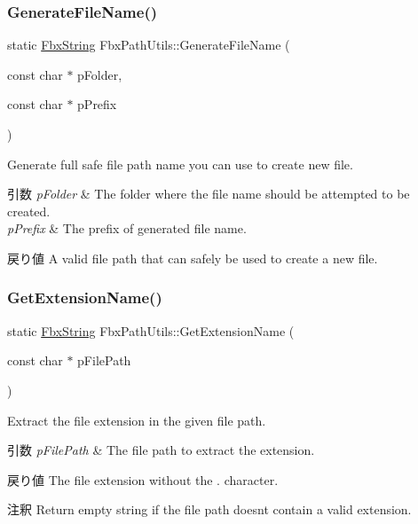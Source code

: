 \subsubsection{\texorpdfstring{Generate\+File\+Name()}{GenerateFileName()}}
{\footnotesize\ttfamily static \hyperlink{class_fbx_string}{Fbx\+String} Fbx\+Path\+Utils\+::\+Generate\+File\+Name (\begin{DoxyParamCaption}\item[{const char $\ast$}]{p\+Folder,  }\item[{const char $\ast$}]{p\+Prefix }\end{DoxyParamCaption})\hspace{0.3cm}{\ttfamily [static]}}

Generate full safe file path name you can use to create new file. 
\begin{DoxyParams}{引数}
{\em p\+Folder} & The folder where the file name should be attempted to be created. \\
\hline
{\em p\+Prefix} & The prefix of generated file name. \\
\hline
\end{DoxyParams}
\begin{DoxyReturn}{戻り値}
A valid file path that can safely be used to create a new file. 
\end{DoxyReturn}
\mbox{\label{class_fbx_path_utils_a2f8743324b82737499681bdaca5adc7e}} 
\subsubsection{\texorpdfstring{Get\+Extension\+Name()}{GetExtensionName()}}
{\footnotesize\ttfamily static \hyperlink{class_fbx_string}{Fbx\+String} Fbx\+Path\+Utils\+::\+Get\+Extension\+Name (\begin{DoxyParamCaption}\item[{const char $\ast$}]{p\+File\+Path }\end{DoxyParamCaption})\hspace{0.3cm}{\ttfamily [static]}}

Extract the file extension in the given file path. 
\begin{DoxyParams}{引数}
{\em p\+File\+Path} & The file path to extract the extension. \\
\hline
\end{DoxyParams}
\begin{DoxyReturn}{戻り値}
The file extension without the \textquotesingle{}.\textquotesingle{} character. 
\end{DoxyReturn}
\begin{DoxyRemark}{注釈}
Return empty string if the file path doesn\textquotesingle{}t contain a valid extension. 
\end{DoxyRemark}
\mbox{\label{class_fbx_path_utils_ac7822ad3605dcfbe63e99a848e959d50}} 

